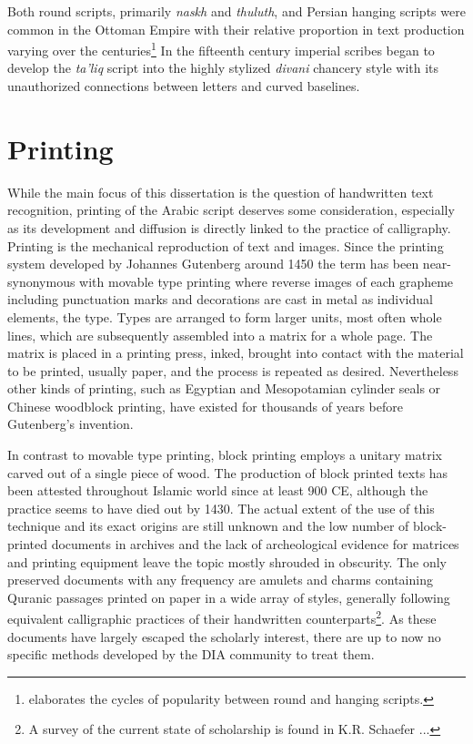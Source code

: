 Both round scripts, primarily \emph{naskh} and \emph{thuluth}, and Persian
hanging scripts were common in the Ottoman Empire with their relative
proportion in text production varying over the centuries\footnote{\cite[chapter
XI]{blair2006islamic} elaborates the cycles of popularity between round and
hanging scripts.} In the fifteenth century imperial scribes began to develop
the \emph{ta'liq} script into the highly stylized \emph{divani} chancery style
with its unauthorized connections between letters and curved baselines.

\section{Printing}

While the main focus of this dissertation is the question of handwritten text
recognition, printing of the Arabic script deserves some consideration,
especially as its development and diffusion is directly linked to the practice
of calligraphy. Printing is the mechanical reproduction of text and images.
Since the printing system developed by Johannes Gutenberg around 1450 the term
has been near-synonymous with movable type printing where reverse images of
each grapheme including punctuation marks and decorations are cast in metal as
individual elements, the type. Types are arranged to form larger units, most
often whole lines, which are subsequently assembled into a matrix for a whole
page. The matrix is placed in a printing press, inked, brought into contact
with the material to be printed, usually paper, and the process is repeated as
desired. Nevertheless other kinds of printing, such as Egyptian and
Mesopotamian cylinder seals or Chinese woodblock printing, have existed for
thousands of years before Gutenberg's invention. 

In contrast to movable type printing, block printing employs a unitary matrix
carved out of a single piece of wood. The production of block printed texts has
been attested throughout Islamic world since at least 900 CE, although the
practice seems to have died out by 1430. The actual extent of the use of this
technique and its exact origins are still unknown and the low number of
block-printed documents in archives and the lack of archeological evidence for
matrices and printing equipment leave the topic mostly shrouded in obscurity.
The only preserved documents with any frequency are amulets and charms
containing Quranic passages printed on paper in a wide array of styles,
generally following equivalent calligraphic practices of their handwritten
counterparts\footnote{A survey of the current state of scholarship is found in
K.R. Schaefer ...}. As these documents have largely escaped the scholarly
interest, there are up to now no specific methods developed by the DIA
community to treat them.

